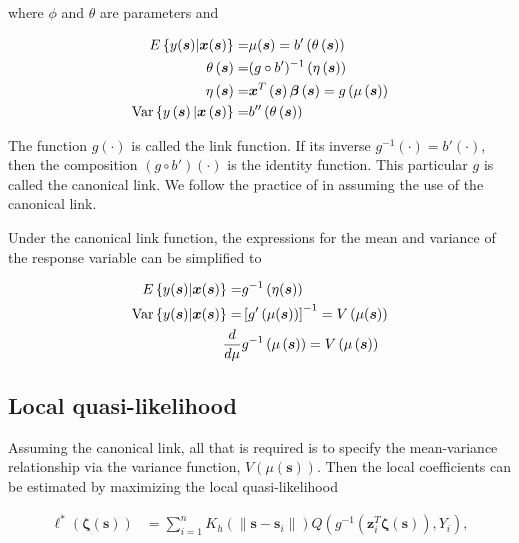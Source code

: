 \documentclass[authoryear,review, 12pt]{elsarticle}
\begin{document}
where $\phi$ and $\theta$ are parameters and

\begin{align*}
E\left\{ y(\bm{s})|\bm{x}(\bm{s})\right\} = & \mu(\bm{s})=b'\left(\theta\left(\bm{s}\right)\right)\\
\theta\left(\bm{s}\right)= & (g\circ b')^{-1}\left(\eta\left(\bm{s}\right)\right)\\
\eta\left(\bm{s}\right)= & \bm{x}^{T}\left(\bm{s}\right)\bm{\beta}\left(\bm{s}\right)=g\left(\mu\left(\bm{s}\right)\right)\\
\text{\text{Var}}\left\{ y\left(\bm{s}\right)|\bm{x}\left(\bm{s}\right)\right\} = & b''\left(\theta\left(\bm{s}\right)\right)
\end{align*}


The function $g(\cdot)$ is called the link function. If its inverse
$g^{-1}(\cdot)=b'(\cdot)$, then the composition $\left(g\circ b'\right)\left(\cdot\right)$
is the identity function. This particular $g$ is called the canonical
link. We follow the practice of \citet{Fan-Heckman-Wand-1995} in
assuming the use of the canonical link.

Under the canonical link function, the expressions for the mean and
variance of the response variable can be simplified to

\begin{align*}
E\left\{ y(\bm{s})|\bm{x}(\bm{s})\right\} = & g^{-1}\left(\eta(\bm{s})\right)\\
\text{\text{Var}}\left\{ y(\bm{s})|\bm{x}(\bm{s})\right\} = & \left[g'\left(\mu(\bm{s})\right)\right]^{-1}=V\left(\mu(\bm{s})\right)\\
\frac{d}{d\mu} & g^{-1}\left(\mu\left(\bm{s}\right)\right)=V\left(\mu\left(\bm{s}\right)\right)
\end{align*}
 


\subsection{Local quasi-likelihood}

Assuming the canonical link, all that is required is to specify the
mean-variance relationship via the variance function, $V\left(\mu\left(\bm{s}\right)\right)$.
Then the local coefficients can be estimated by maximizing the local
quasi-likelihood 

\begin{align}
\mathcal{\ell}^{*}\left(\bm{\zeta}(\bm{s})\right) & =\sum_{i=1}^{n}K_{h}\left(\|\bm{s}-\bm{s}_{i}\|\right)Q\left(g^{-1}\left(\bm{z}_{i}^{T}\bm{\zeta}(\bm{s})\right),Y_{i}\right),
\end{align}
\end{document}
